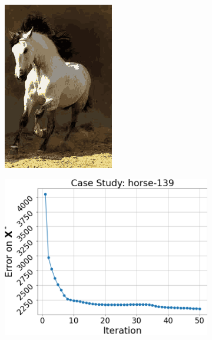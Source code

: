 \begin{figure}[htbp]
\begin{subfigure}[t]{0.32\textwidth}
        \includegraphics[width=\linewidth]{../../python_code/plots/kmeans/horse-139/reconstruction.png}
    \end{subfigure}
    \begin{subfigure}[t]{0.32\textwidth}
        \includegraphics[width=\linewidth]{../../python_code/plots/kmeans/horse-139/elbow_curve.png}

\end{subfigure}
\end{figure}
